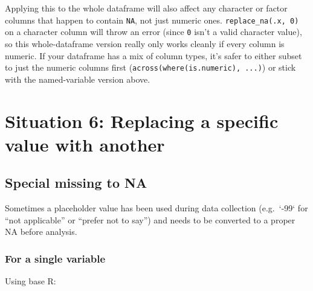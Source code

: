 \documentclass[
  letterpaper,
  DIV=11,
  numbers=noendperiod]{scrreprt}
\newenvironment{Shaded}{\begin{snugshade}}{\end{snugshade}}
\newcommand{\ConstantTok}[1]{\textcolor[rgb]{0.56,0.35,0.01}{#1}}
\newcommand{\DecValTok}[1]{\textcolor[rgb]{0.68,0.00,0.00}{#1}}
\newcommand{\NormalTok}[1]{\textcolor[rgb]{0.00,0.23,0.31}{#1}}
\newcommand{\OtherTok}[1]{\textcolor[rgb]{0.00,0.23,0.31}{#1}}
\newcommand{\SpecialCharTok}[1]{\textcolor[rgb]{0.37,0.37,0.37}{#1}}
\begin{document}
\begin{tcolorbox}[enhanced jigsaw, toprule=.15mm, coltitle=black, colframe=quarto-callout-important-color-frame, colbacktitle=quarto-callout-important-color!10!white, opacityback=0, left=2mm, breakable, rightrule=.15mm, bottomrule=.15mm, leftrule=.75mm, titlerule=0mm, arc=.35mm, opacitybacktitle=0.6, toptitle=1mm, bottomtitle=1mm, title=\textcolor{quarto-callout-important-color}{\faExclamation}\hspace{0.5em}{Important}, colback=white]

Applying this to the whole dataframe will also affect any character or
factor columns that happen to contain \texttt{NA}, not just numeric
ones. \texttt{replace\_na(.x,\ 0)} on a character column will throw an
error (since \texttt{0} isn't a valid character value), so this
whole-dataframe version really only works cleanly if every column is
numeric. If your dataframe has a mix of column types, it's safer to
either subset to just the numeric columns first
(\texttt{across(where(is.numeric),\ ...)}) or stick with the
named-variable version above.

\end{tcolorbox}

\section{Situation 6: Replacing a specific value with
another}\label{situation-6-replacing-a-specific-value-with-another}

\subsection{Special missing to NA}\label{special-missing-to-na}

Sometimes a placeholder value has been used during data collection
(e.g.~`-99` for ``not applicable'' or ``prefer not to say'') and needs
to be converted to a proper NA before analysis.

\subsubsection{For a single variable}\label{for-a-single-variable}

Using base R:

\begin{Shaded}
\end{Shaded}
\end{document}
